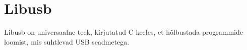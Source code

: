 
\section{Libusb}\label{sec:libusb}
Libusb on universaalne teek, kirjutatud C keeles, et hõlbustada programmide loomist, mis suhtlevad USB seadmetega.


